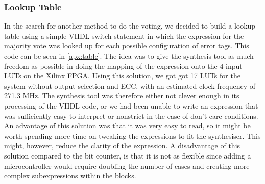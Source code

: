 \subsubsection{Lookup Table}
In the search for another method to do the voting, we decided to build
a lookup table using a simple VHDL switch statement in which the
expression for the majority vote was looked up for each possible
configuration of error tags. This code can be seen in
\autoref{apx:table}. The idea was to give the synthesis tool as much
freedom as possible in doing the mapping of the expression onto the
4-input LUTs on the Xilinx FPGA. Using this solution, we got got 17
LUTs for the system without output selection and ECC, with an
estimated clock frequency of 271.3 MHz. The synthesis tool was
therefore either not clever enough in its processing of the VHDL code,
or we had been unable to write an expression that was sufficiently
easy to interpret or nonstrict in the case of don't care
conditions. An advantage of this solution was that it was very easy to
read, so it might be worth spending more time on tweaking the
expressions to fit the synthesiser. This might, however, reduce the
clarity of the expression. A disadvantage of this solution compared to
the bit counter, is that it is not as flexible since adding a
microcontroller would require doubling the number of cases and
creating more complex subexpressions within the blocks.

